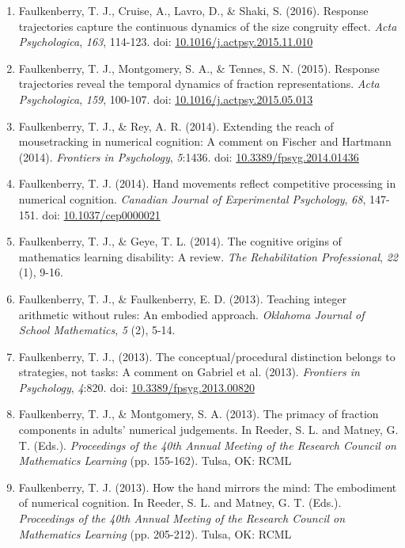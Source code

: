 \documentclass[article,10pt]{article}
\begin{document}
\begin{enumerate}
\item Faulkenberry, T. J., Cruise, A., Lavro, D., \& Shaki, S. (2016). Response trajectories capture the continuous dynamics of the size congruity effect. \emph{Acta Psychologica}, \emph{163}, 114-123. doi: \href{http://dx.doi.org/10.1016/j.actpsy.2015.11.010}{10.1016/j.actpsy.2015.11.010}
\item Faulkenberry, T. J., Montgomery, S. A., \& Tennes, S. N. (2015). Response trajectories reveal the temporal dynamics of fraction representations. \emph{Acta Psychologica}, \emph{159}, 100-107. doi: \href{http://dx.doi.org/10.1016/j.actpsy.2015.05.013}{10.1016/j.actpsy.2015.05.013}
\item Faulkenberry, T. J., \& Rey, A. R. (2014). Extending the reach of mousetracking in numerical cognition: A comment on Fischer and Hartmann (2014). \emph{Frontiers in Psychology}, \emph{5}:1436. doi: \href{http://dx.doi.org/10.3389/fpsyg.2014.01436}{10.3389/fpsyg.2014.01436}
\item Faulkenberry, T. J. (2014). Hand movements reflect competitive processing in numerical cognition. \emph{Canadian Journal of Experimental Psychology}, \emph{68}, 147-151. doi: \href{http://dx.doi.org/10.1037/cep0000021}{10.1037/cep0000021}
\item Faulkenberry, T. J., \& Geye, T. L. (2014). The cognitive origins of mathematics learning disability: A review. \emph{The Rehabilitation Professional}, \emph{22} (1), 9-16.
\item Faulkenberry, T. J., \& Faulkenberry, E. D. (2013). Teaching integer arithmetic without rules: An embodied approach. \emph{Oklahoma Journal of School Mathematics}, \emph{5} (2), 5-14.
\item Faulkenberry, T. J., (2013). The conceptual/procedural distinction belongs to strategies, not tasks: A comment on Gabriel et al. (2013). \emph{Frontiers in Psychology}, \emph{4}:820. doi: \href{http://dx.doi.org/10.3389/fpsyg.2013.00820}{10.3389/fpsyg.2013.00820}
\item Faulkenberry, T. J., \& Montgomery, S. A. (2013). The primacy of fraction components in adults’ numerical judgements. In Reeder, S. L. and Matney, G. T. (Eds.). \emph{Proceedings of the 40th Annual Meeting of the Research Council on Mathematics Learning} (pp. 155-162). Tulsa, OK: RCML
\item Faulkenberry, T. J. (2013). How the hand mirrors the mind: The embodiment of numerical cognition. In Reeder, S. L. and Matney, G. T. (Eds.). \emph{Proceedings of the 40th Annual Meeting of the Research Council on Mathematics Learning} (pp. 205-212). Tulsa, OK: RCML

\end{enumerate}
\end{document}
